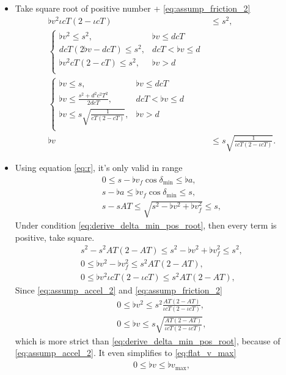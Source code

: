 \begin{itemize}
\item
Take square root of positive number + \eqref{eq:assump_friction_2}
\begin{align}
\nonumber
\flat{v}^2 \iota cT (2 - \iota cT) &\le s^2,\\
\nonumber
\begin{cases}
\flat{v}^2 \le s^2, &\flat{v} \le d cT\\
d cT (2 \flat{v} - d cT) \le s^2, &d cT < \flat{v} \le d\\
\flat{v}^2 cT (2 - cT) \le s^2, &\flat{v} > d\\
\end{cases}\\
\nonumber
\begin{cases}
\flat{v} \le s, &\flat{v} \le d cT\\
\flat{v} \le \frac{s^2 + d^2 c^2 T^2}{2 d cT}, &d cT < \flat{v} \le d\\
\flat{v} \le s \sqrt{\frac{1}{cT (2 - cT)}}, &\flat{v} > d\\
\end{cases}\\
\label{eq:derive_delta_min_pos_root}
\flat{v} &\le s\sqrt{\frac{1}{\iota cT (2 - \iota cT)}}.
\end{align}

\item
Using equation \eqref{eq:r}, it's only valid in range
\begin{align*}
0 \le s - \flat{v}_f \cos\delta_{\min} \le \flat{a},\\
s - \flat{a} \le \flat{v}_f \cos\delta_{\min} \le s,\\
s - sAT \le \sqrt{s^2 - \flat{v}^2 + \flat{v}_f^2} \le s,
\end{align*}
Under condition \eqref{eq:derive_delta_min_pos_root}, then every term is positive, take square.
\begin{align*}
s^2 - s^2 AT (2 - AT) \le s^2 - \flat{v}^2 + \flat{v}_f^2 \le s^2,\\
0 \le \flat{v}^2 - \flat{v}_f^2 \le s^2 AT(2 - AT),\\
0 \le \flat{v}^2 \iota cT(2 - \iota cT) \le s^2 AT(2 - AT),
\end{align*}
Since \eqref{eq:assump_accel_2} and \eqref{eq:assump_friction_2}
\begin{align}
\nonumber
0 \le \flat{v}^2 \le s^2 \frac{AT(2 - AT)}{\iota cT(2 - \iota cT)},\\
\label{eq:delta_min_constraint}
0 \le \flat{v} \le s\sqrt{\frac{AT(2 - AT)}{\iota cT(2 - \iota cT)}},
\end{align}
which is more strict than \eqref{eq:derive_delta_min_pos_root}, because of \eqref{eq:assump_accel_2}. It even simplifies to \eqref{eq:flat_v_max}
\begin{align}
0 \le \flat{v} \le \flat{v}_{\max},
\end{align}


\end{itemize}
